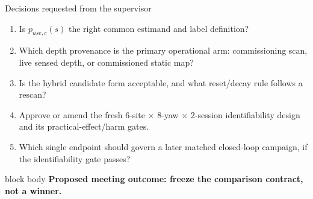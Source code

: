 \documentclass[aspectratio=169,10pt]{beamer}
\begin{document}
\begin{frame}{Decisions requested from the supervisor}
  \begin{enumerate}\setlength\itemsep{0.65em}
    \item Is $p_{use,c}(s)$ the right common estimand and label definition?
    \item Which depth provenance is the primary operational arm: commissioning scan,
      live sensed depth, or commissioned static map?
    \item Is the hybrid candidate form acceptable, and what reset/decay rule follows a rescan?
    \item Approve or amend the fresh 6-site $\times$ 8-yaw $\times$ 2-session identifiability design
      and its practical-effect/harm gates.
    \item Which single endpoint should govern a later matched closed-loop campaign, if the
      identifiability gate passes?
  \end{enumerate}
  \vspace{0.25cm}
  \begin{beamercolorbox}[wd=\linewidth,sep=.2cm,rounded=true]{block body}
    \centering\large\textbf{Proposed meeting outcome: freeze the comparison contract, not a winner.}
  \end{beamercolorbox}
\end{frame}
\end{document}
